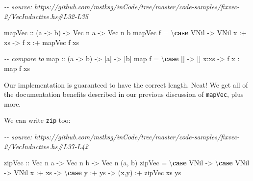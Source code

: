\documentclass[]{article}
\newenvironment{Shaded}{}{}
\newcommand{\CommentTok}[1]{\textcolor[rgb]{0.38,0.63,0.69}{\textit{#1}}}
\newcommand{\DataTypeTok}[1]{\textcolor[rgb]{0.56,0.13,0.00}{#1}}
\newcommand{\FunctionTok}[1]{\textcolor[rgb]{0.02,0.16,0.49}{#1}}
\newcommand{\KeywordTok}[1]{\textcolor[rgb]{0.00,0.44,0.13}{\textbf{#1}}}
\newcommand{\NormalTok}[1]{#1}
\newcommand{\OperatorTok}[1]{\textcolor[rgb]{0.40,0.40,0.40}{#1}}
\newcommand{\OtherTok}[1]{\textcolor[rgb]{0.00,0.44,0.13}{#1}}
\begin{document}
\begin{Shaded}
\begin{Highlighting}[]
\CommentTok{{-}{-} source: https://github.com/mstksg/inCode/tree/master/code{-}samples/fixvec{-}2/VecInductive.hs\#L32{-}L35}

\OtherTok{mapVec ::}\NormalTok{ (a }\OtherTok{{-}\textgreater{}}\NormalTok{ b) }\OtherTok{{-}\textgreater{}} \DataTypeTok{Vec}\NormalTok{ n a }\OtherTok{{-}\textgreater{}} \DataTypeTok{Vec}\NormalTok{ n b}
\NormalTok{mapVec f }\OtherTok{=}\NormalTok{ \textbackslash{}}\KeywordTok{case}
    \DataTypeTok{VNil}    \OtherTok{{-}\textgreater{}} \DataTypeTok{VNil}
\NormalTok{    x }\OperatorTok{:+}\NormalTok{ xs }\OtherTok{{-}\textgreater{}}\NormalTok{ f x }\OperatorTok{:+}\NormalTok{ mapVec f xs}

\CommentTok{{-}{-} compare to}
\FunctionTok{map}\OtherTok{ ::}\NormalTok{ (a }\OtherTok{{-}\textgreater{}}\NormalTok{ b) }\OtherTok{{-}\textgreater{}}\NormalTok{ [a] }\OtherTok{{-}\textgreater{}}\NormalTok{ [b]}
\FunctionTok{map}\NormalTok{ f }\OtherTok{=}\NormalTok{ \textbackslash{}}\KeywordTok{case}
\NormalTok{    [] }\OtherTok{{-}\textgreater{}}\NormalTok{ []}
\NormalTok{    x}\OperatorTok{:}\NormalTok{xs }\OtherTok{{-}\textgreater{}}\NormalTok{ f x }\OperatorTok{:} \FunctionTok{map}\NormalTok{ f xs}
\end{Highlighting}
\end{Shaded}

Our implementation is guaranteed to have the correct length. Neat! We get all of
the documentation benefits described in our previous discussion of
\texttt{mapVec}, plus more.

We can write \texttt{zip} too:

\begin{Shaded}
\begin{Highlighting}[]
\CommentTok{{-}{-} source: https://github.com/mstksg/inCode/tree/master/code{-}samples/fixvec{-}2/VecInductive.hs\#L37{-}L42}

\OtherTok{zipVec ::} \DataTypeTok{Vec}\NormalTok{ n a }\OtherTok{{-}\textgreater{}} \DataTypeTok{Vec}\NormalTok{ n b }\OtherTok{{-}\textgreater{}} \DataTypeTok{Vec}\NormalTok{ n (a, b)}
\NormalTok{zipVec }\OtherTok{=}\NormalTok{ \textbackslash{}}\KeywordTok{case}
    \DataTypeTok{VNil} \OtherTok{{-}\textgreater{}}\NormalTok{ \textbackslash{}}\KeywordTok{case}
      \DataTypeTok{VNil} \OtherTok{{-}\textgreater{}} \DataTypeTok{VNil}
\NormalTok{    x }\OperatorTok{:+}\NormalTok{ xs }\OtherTok{{-}\textgreater{}}\NormalTok{ \textbackslash{}}\KeywordTok{case}
\NormalTok{      y }\OperatorTok{:+}\NormalTok{ ys }\OtherTok{{-}\textgreater{}}\NormalTok{ (x,y) }\OperatorTok{:+}\NormalTok{ zipVec xs ys}
\end{Highlighting}
\end{Shaded}
\end{document}
